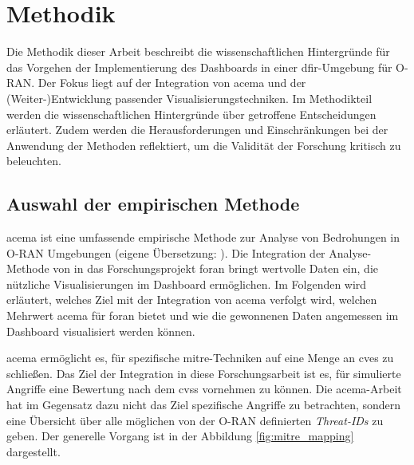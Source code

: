 \chapter{Methodik}
\label{chap:methodik}
Die Methodik dieser Arbeit beschreibt die wissenschaftlichen Hintergründe für das Vorgehen der Implementierung des Dashboards in einer \gls{dfir}-Umgebung für O-RAN. Der Fokus liegt auf der Integration von \gls{acema} und der (Weiter-)Entwicklung passender Visualisierungstechniken. Im Methodikteil werden die wissenschaftlichen Hintergründe über getroffene Entscheidungen erläutert. Zudem werden die Herausforderungen und Einschränkungen bei der Anwendung der Methoden reflektiert, um die Validität der Forschung kritisch zu beleuchten.
\section{Auswahl der empirischen Methode}
\label{sec:auswahlDerEmpirischenMethode}
\gls{acema} ist \glqq eine umfassende empirische Methode zur Analyse von Bedrohungen in O-RAN Umgebungen \grqq (eigene Übersetzung: \autocite{klementSecuring6GTransition2024}). Die Integration der Analyse-Methode von \citeauthor{klementSecuring6GTransition2024} in das Forschungsprojekt \gls{foran} bringt wertvolle Daten ein, die nützliche Visualisierungen im Dashboard ermöglichen. Im Folgenden wird erläutert, welches Ziel mit der Integration von \gls{acema} verfolgt wird, welchen Mehrwert \gls{acema} für \gls{foran} bietet und wie die gewonnenen Daten angemessen im Dashboard visualisiert werden können.
\par \gls{acema} ermöglicht es, für spezifische \gls{mitre}-Techniken auf eine Menge an \glspl{cve} zu schließen. Das Ziel der Integration in diese Forschungsarbeit ist es, für simulierte Angriffe eine Bewertung nach dem \gls{cvss} vornehmen zu können. Die \gls{acema}-Arbeit hat im Gegensatz dazu nicht das Ziel spezifische Angriffe zu betrachten, sondern eine Übersicht über alle möglichen von der O-RAN definierten \textit{Threat-IDs} zu geben. Der generelle Vorgang ist in der Abbildung \ref{fig:mitre_mapping} dargestellt. 

